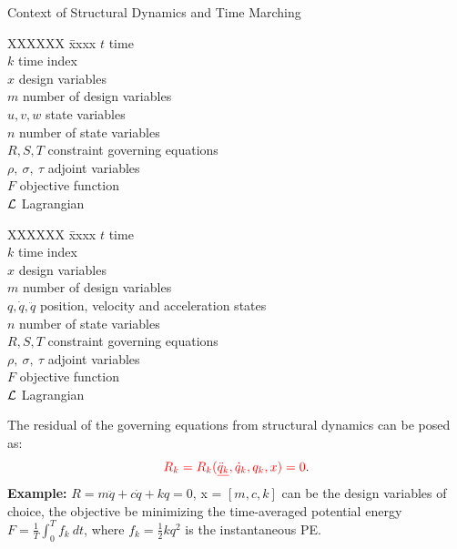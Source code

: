 \documentclass{beamer}
\newenvironment{noheadline}{
    \setbeamertemplate{headline}{}
    \addtobeamertemplate{frametitle}{\vspace*{-1.5\baselineskip}}{}
}{}
\begin{document}
\begin{noheadline}
\begin{frame}[allowframebreaks]
{  \begin{block}{Context of Structural Dynamics and Time Marching}
    \begin{minipage}{0.45\linewidth}
      \begin{tabbing}
        XXXXXX \= xxxx\kill
        $t$     \> time \\
        $k$     \> time index \\
        $x$     \> design variables \\
        $m$     \> number of design variables \\
        \colorbox{blue!20}{$u,v,w$} \> \colorbox{blue!20}{state variables} \\
        $n$  \> number of state variables \\
         \colorbox{green!20}{$R, S, T$} \> constraint governing equations  \\
        $\rho ,~ \sigma ,~\tau$ \> adjoint variables  \\
        $F$     \> objective function \\
        $\cal{L}$ \> Lagrangian \\
      \end{tabbing}
    \end{minipage}\hfill
    \begin{minipage}{0.45\linewidth}
      \begin{tabbing}
        XXXXXX \= xxxx\kill
        $t$     \> time \\
        $k$     \> time index \\
        $x$     \> design variables \\
        $m$     \> number of design variables \\
        \colorbox{blue!20}{$q,\dot{q},\ddot{q}$} \> \colorbox{blue!20}{position, velocity and acceleration states} \\
        $n$  \> number of state variables \\
        \colorbox{green!20}{$R, S, T$} \> constraint governing equations  \\
        $\rho ,~ \sigma ,~\tau$ \> adjoint variables  \\
        $F$     \> objective function \\
        $\cal{L}$ \> Lagrangian \\
      \end{tabbing}
    \end{minipage}
  \end{block}

    The residual of the governing equations from structural dynamics
    can be posed as: 
    \begin{equation}\label{eqn:nbg-residual}
      \textcolor{red}{R_k = R_k(\underline{\ddot{q}_k}, \dot{q}_k, q_k, x) = 0}.
    \end{equation}
    \textbf{Example:} $R = m\ddot{q} + c\dot{q} + k{q} = 0$, x = $[m,
      c, k]$ can be the design variables of choice, the objective be
    minimizing the time-averaged potential energy $F = \frac{1}{T}
    \int_{0}^T f_k~dt$, where $f_k = \frac{1}{2} kq^2$ is the
    instantaneous PE.

}
\end{frame}
\end{noheadline}
\end{document}

